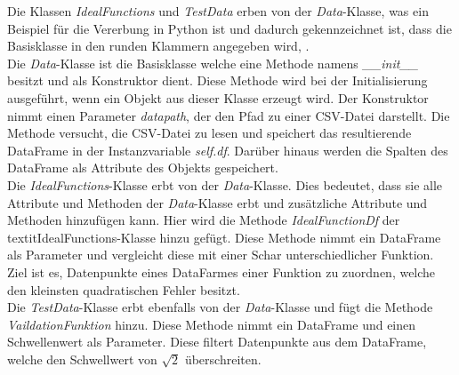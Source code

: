 Die Klassen \textit{IdealFunctions} und \textit{TestData} erben von der \textit{Data}-Klasse, was ein Beispiel für die Vererbung in Python ist und dadurch gekennzeichnet ist, dass die Basisklasse in den runden Klammern angegeben wird, \cite{Häberlein:2024}. \\

Die \textit{Data}-Klasse ist die Basisklasse welche eine Methode namens \textit{\_\_init\_\_} besitzt und als Konstruktor dient. Diese Methode wird bei der Initialisierung ausgeführt, wenn ein Objekt aus dieser Klasse erzeugt wird. Der Konstruktor nimmt einen Parameter \textit{datapath}, der den Pfad zu einer CSV-Datei darstellt. Die Methode versucht, die CSV-Datei zu lesen und speichert das resultierende DataFrame in der Instanzvariable \textit{self.df}. Darüber hinaus werden die Spalten des DataFrame als Attribute des Objekts gespeichert.\\

Die \textit{IdealFunctions}-Klasse erbt von der \textit{Data}-Klasse. Dies bedeutet, dass sie alle Attribute und Methoden der \textit{Data}-Klasse erbt und zusätzliche Attribute und Methoden hinzufügen kann. Hier wird die Methode \textit{\textit{IdealFunctionDf}} der textit{IdealFunctions}-Klasse hinzu gefügt. Diese Methode nimmt ein DataFrame als Parameter und vergleicht diese mit einer Schar unterschiedlicher Funktion. Ziel ist es, Datenpunkte eines DataFarmes einer Funktion zu zuordnen, welche den kleinsten quadratischen Fehler besitzt.\\

Die \textit{TestData}-Klasse erbt ebenfalls von der \textit{Data}-Klasse und fügt die Methode \textit{VaildationFunktion} hinzu. Diese Methode nimmt ein DataFrame und einen Schwellenwert als Parameter. Diese filtert Datenpunkte aus dem DataFrame, welche den Schwellwert von $\sqrt{2}$ überschreiten.



